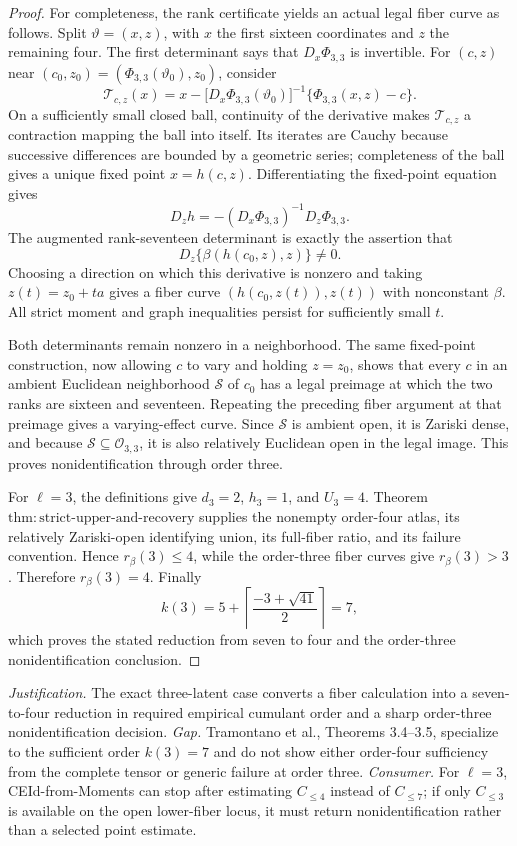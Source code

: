 \documentclass{article}
\begin{document}
\begin{proof}
For completeness, the rank certificate yields an actual legal fiber curve as follows.  Split \(\vartheta=(x,z)\), with \(x\) the first sixteen coordinates and \(z\) the remaining four.  The first determinant says that \(D_x\Phi_{3,3}\) is invertible.  For \((c,z)\) near \((c_0,z_0)=(\Phi_{3,3}(\vartheta_0),z_0)\), consider
\[
 \mathcal T_{c,z}(x)=x-\bigl[D_x\Phi_{3,3}(\vartheta_0)\bigr]^{-1}
       \{\Phi_{3,3}(x,z)-c\}.
\]
On a sufficiently small closed ball, continuity of the derivative makes \(\mathcal T_{c,z}\) a contraction mapping the ball into itself.  Its iterates are Cauchy because successive differences are bounded by a geometric series; completeness of the ball gives a unique fixed point \(x=h(c,z)\).  Differentiating the fixed-point equation gives
\[
 D_zh=-(D_x\Phi_{3,3})^{-1}D_z\Phi_{3,3}.
\]
The augmented rank-seventeen determinant is exactly the assertion that
\[
 D_z\{\beta(h(c_0,z),z)\}\ne0.
\]
Choosing a direction on which this derivative is nonzero and taking \(z(t)=z_0+ta\) gives a fiber curve \((h(c_0,z(t)),z(t))\) with nonconstant \(\beta\).  All strict moment and graph inequalities persist for sufficiently small \(t\).

Both determinants remain nonzero in a neighborhood.  The same fixed-point construction, now allowing \(c\) to vary and holding \(z=z_0\), shows that every \(c\) in an ambient Euclidean neighborhood \(\mathcal S\) of \(c_0\) has a legal preimage at which the two ranks are sixteen and seventeen.  Repeating the preceding fiber argument at that preimage gives a varying-effect curve.  Since \(\mathcal S\) is ambient open, it is Zariski dense, and because \(\mathcal S\subseteq\mathcal O_{3,3}\), it is also relatively Euclidean open in the legal image.  This proves nonidentification through order three.

For \(\ell=3\), the definitions give \(d_3=2\), \(h_3=1\), and \(U_3=4\).  Theorem \(\mathrm{thm:strict\mbox{-}upper\mbox{-}and\mbox{-}recovery}\) supplies the nonempty order-four atlas, its relatively Zariski-open identifying union, its full-fiber ratio, and its failure convention.  Hence \(r_\beta(3)\le4\), while the order-three fiber curves give \(r_\beta(3)>3\).  Therefore \(r_\beta(3)=4\).  Finally
\[
 k(3)=5+\left\lceil\frac{-3+\sqrt{41}}2\right\rceil=7,
\]
which proves the stated reduction from seven to four and the order-three nonidentification conclusion.
\end{proof}
\par\smallskip\noindent \textit{Justification.} The exact three-latent case converts a fiber calculation into a seven-to-four reduction in required empirical cumulant order and a sharp order-three nonidentification decision. \textit{Gap.} Tramontano et al., Theorems 3.4--3.5, specialize to the sufficient order \(k(3)=7\) and do not show either order-four sufficiency from the complete tensor or generic failure at order three. \textit{Consumer.} For \(\ell=3\), CEId-from-Moments can stop after estimating \(C_{\le4}\) instead of \(C_{\le7}\); if only \(C_{\le3}\) is available on the open lower-fiber locus, it must return nonidentification rather than a selected point estimate.
\end{document}
